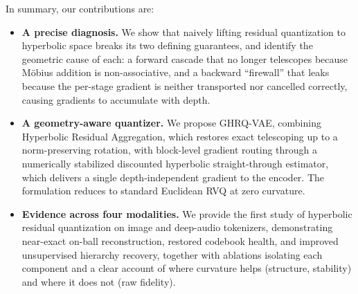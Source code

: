 \documentclass[12pt]{report}
\begin{document}
In summary, our contributions are:
\begin{itemize}
  \item \textbf{A precise diagnosis.} We show that naively lifting residual quantization to
  hyperbolic space breaks its two defining guarantees, and identify the geometric cause of
  each: a forward cascade that no longer telescopes because M\"obius addition is
  non-associative, and a backward ``firewall'' that leaks because the per-stage gradient is
  neither transported nor cancelled correctly, causing gradients to accumulate with depth.
  \item \textbf{A geometry-aware quantizer.} We propose GHRQ-VAE, combining Hyperbolic
  Residual Aggregation, which restores exact telescoping up to a norm-preserving rotation,
  with block-level gradient routing through a numerically stabilized discounted hyperbolic
  straight-through estimator, which delivers a single depth-independent gradient to the
  encoder. The formulation reduces to standard Euclidean RVQ at zero curvature.
  \item \textbf{Evidence across four modalities.} We provide the first study of hyperbolic
  residual quantization on image and deep-audio tokenizers, demonstrating near-exact on-ball
  reconstruction, restored codebook health, and improved unsupervised hierarchy recovery,
  together with ablations isolating each component and a clear account of where curvature
  helps (structure, stability) and where it does not (raw fidelity).
\end{itemize}



\end{document}
